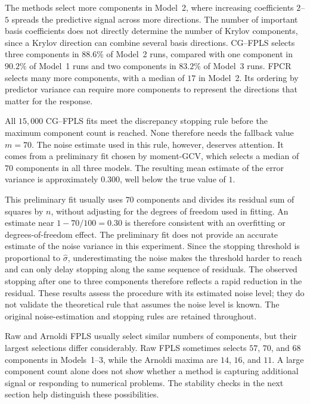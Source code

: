The methods select more components in Model~2, where increasing coefficients
$2$--$5$ spreads the predictive signal across more directions. The number
of important basis coefficients does not directly determine the number of
Krylov components, since a Krylov direction can combine several basis
directions. CG--FPLS selects three components in $88.6\%$ of Model~2 runs,
compared with one component in $90.2\%$ of Model~1 runs and two components
in $83.2\%$ of Model~3 runs. FPCR selects many more components, with a
median of $17$ in Model~2. Its ordering by predictor variance can require
more components to represent the directions that matter for the response.

All $15{,}000$ CG--FPLS fits meet the discrepancy stopping rule before the
maximum component count is reached. None therefore needs the fallback value
$m=70$. The noise estimate used in this rule, however, deserves attention.
It comes from a preliminary fit chosen by moment-GCV, which selects a median
of $70$ components in all three models. The resulting mean estimate of the
error variance is approximately $0.300$, well below the true value of $1$.

This preliminary fit usually uses $70$ components and divides its residual
sum of squares by $n$, without adjusting for the degrees of freedom used in
fitting. An estimate near $1-70/100=0.30$ is therefore consistent with an
overfitting or degrees-of-freedom effect. The preliminary fit does not provide
an accurate estimate of the noise variance in this experiment. Since the
stopping threshold is proportional to $\widehat\sigma$, underestimating the
noise makes the threshold harder to reach and can only delay stopping along
the same sequence of residuals. The observed stopping after one to three
components therefore reflects a rapid reduction in the residual. These
results assess the procedure with its estimated noise level; they do not
validate the theoretical rule that assumes the noise level is known. The
original noise-estimation and stopping rules are retained throughout.

Raw and Arnoldi FPLS usually select similar numbers of components, but their
largest selections differ considerably. Raw FPLS sometimes selects $57$,
$70$, and $68$ components in Models~1--3, while the Arnoldi maxima are $14$,
$16$, and $11$. A large component count alone does not show whether a method
is capturing additional signal or responding to numerical problems. The
stability checks in the next section help distinguish these possibilities.

